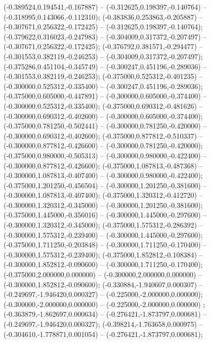  (-0.389524,0.194541,-0.167887) -- (-0.312625,0.198397,-0.140764) -- (-0.318995,0.143066,-0.112310);
 (-0.383836,0.253863,-0.205887) -- (-0.307671,0.256322,-0.172425) -- (-0.312625,0.198397,-0.140764);
 (-0.379622,0.316023,-0.247983) -- (-0.304009,0.317372,-0.207497) -- (-0.307671,0.256322,-0.172425);
 (-0.376792,0.381571,-0.294477) -- (-0.301553,0.382119,-0.246253) -- (-0.304009,0.317372,-0.207497);
 (-0.375286,0.451104,-0.345749) -- (-0.300247,0.451196,-0.289036) -- (-0.301553,0.382119,-0.246253);
 (-0.375000,0.525312,-0.401235) -- (-0.300000,0.525312,-0.335400) -- (-0.300247,0.451196,-0.289036);
 (-0.375000,0.605000,-0.447891) -- (-0.300000,0.605000,-0.374400) -- (-0.300000,0.525312,-0.335400);
 (-0.375000,0.690312,-0.481626) -- (-0.300000,0.690312,-0.402600) -- (-0.300000,0.605000,-0.374400);
 (-0.375000,0.781250,-0.502441) -- (-0.300000,0.781250,-0.420000) -- (-0.300000,0.690312,-0.402600);
 (-0.375000,0.877812,-0.510337) -- (-0.300000,0.877812,-0.426600) -- (-0.300000,0.781250,-0.420000);
 (-0.375000,0.980000,-0.505313) -- (-0.300000,0.980000,-0.422400) -- (-0.300000,0.877812,-0.426600);
 (-0.375000,1.087813,-0.487368) -- (-0.300000,1.087813,-0.407400) -- (-0.300000,0.980000,-0.422400);
 (-0.375000,1.201250,-0.456504) -- (-0.300000,1.201250,-0.381600) -- (-0.300000,1.087813,-0.407400);
 (-0.375000,1.320312,-0.412720) -- (-0.300000,1.320312,-0.345000) -- (-0.300000,1.201250,-0.381600);
 (-0.375000,1.445000,-0.356016) -- (-0.300000,1.445000,-0.297600) -- (-0.300000,1.320312,-0.345000);
 (-0.375000,1.575312,-0.286392) -- (-0.300000,1.575312,-0.239400) -- (-0.300000,1.445000,-0.297600);
 (-0.375000,1.711250,-0.203848) -- (-0.300000,1.711250,-0.170400) -- (-0.300000,1.575312,-0.239400);
 (-0.375000,1.852812,-0.108384) -- (-0.300000,1.852812,-0.090600) -- (-0.300000,1.711250,-0.170400);
 (-0.375000,2.000000,0.000000) -- (-0.300000,2.000000,0.000000) -- (-0.300000,1.852812,-0.090600);
 (-0.330884,-1.940607,0.000307) -- (-0.249697,-1.946420,0.000327) -- (-0.225000,-2.000000,0.000000);
 (-0.300000,-2.000000,0.000000) -- (-0.225000,-2.000000,0.000000) ;
 (-0.363879,-1.862697,0.000634) -- (-0.276421,-1.873797,0.000681) -- (-0.249697,-1.946420,0.000327);
 (-0.398214,-1.763658,0.000975) -- (-0.304610,-1.778871,0.001054) -- (-0.276421,-1.873797,0.000681);
